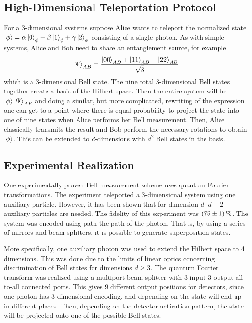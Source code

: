 \subsection{High-Dimensional Teleportation Protocol}
For a 3-dimensional systems suppose Alice wants to teleport the normalized state $\ket{\phi} = \alpha \ket{0}_\phi + \beta \ket{1}_\phi + \gamma \ket{2}_\phi$ consisting of a single photon. As with simple systems, Alice and Bob need to share an entanglement source, for example 
\begin{equation}
    \ket{\Psi}_{AB} = \frac{\ket{00}_{AB} + \ket{11}_{AB} + \ket{22}_{AB}}{\sqrt{3}}
\end{equation}
which is a 3-dimensional Bell state. The nine total 3-dimensional Bell states together create a basis of the Hilbert space. Then the entire system will be $\ket{\phi}\ket{\Psi}_{AB}$ and doing a similar, but more complicated, rewriting of the expression one can get to a point where there is equal probability to project the state into one of nine states when Alice performs her Bell measurement. Then, Alice classically transmits the result and Bob perform the necessary rotations to obtain $\ket{\phi}$. This can be extended to $d$-dimensions with $d^2$ Bell states in the basis. \cite{Luo:2019}

\subsection{Experimental Realization}
One experimentally proven Bell measurement scheme uses quantum Fourier transformations. The experiment teleported a 3-dimensional system using one auxiliary particle. However, it has been shown that for dimension $d$, $d-2$ auxiliary particles are needed. The fidelity of this experiment was $\SI{75\pm 1}{\percent}$. The system was encoded using path the path of the photon. That is, by using a series of mirrors and beam splitters, it is possible to generate superposition states. \cite{Luo:2019}

More specifically, one auxiliary photon was used to extend the Hilbert space to 4 dimensions. This was done due to the limits of linear optics concerning discrimination of Bell states for dimensions $d \geq 3$. The quantum Fourier transform was realized using a multiport beam splitter with 3-input-3-output all-to-all connected ports. This gives 9 different output positions for detectors, since one photon has 3-dimensional encoding, and depending on the state will end up in different places. Then, depending on the detector activation pattern, the state will be projected onto one of the possible Bell states. \cite{Luo:2019}